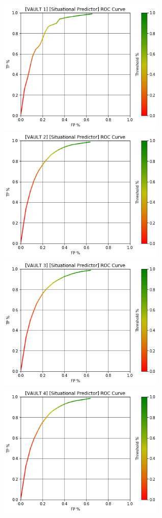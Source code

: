 \begin{figure}[h]
\centering
\includegraphics[width=8cm]{body/results/Graphs/SituationalPredictions/MetaWhenZero/v1.png}
\includegraphics[width=8cm]{body/results/Graphs/SituationalPredictions/MetaWhenZero/v2.png}
\includegraphics[width=8cm]{body/results/Graphs/SituationalPredictions/MetaWhenZero/v3.png}
\includegraphics[width=8cm]{body/results/Graphs/SituationalPredictions/MetaWhenZero/v4.png}

\end{figure}
